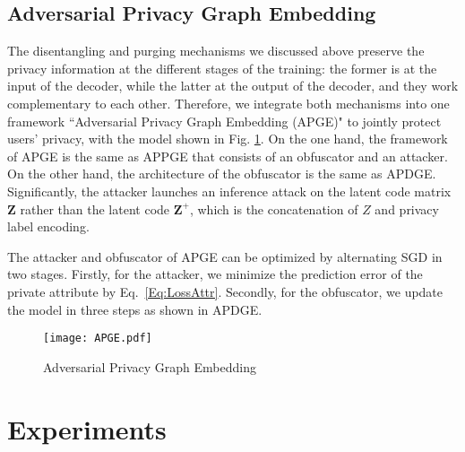 \documentclass{article}
\begin{document}
\subsection{Adversarial Privacy Graph Embedding}
The disentangling and purging mechanisms we discussed above preserve the privacy information at the different stages of the training: the former is at the input of the decoder, while the latter at the output of the decoder, and they work complementary to each other. Therefore, we integrate both mechanisms into one framework ``Adversarial Privacy Graph Embedding (APGE)" to jointly protect users' privacy, with the model shown in Fig. \ref{Fig:ASPGE}. On the one hand, the framework of APGE is the same as APPGE that consists of an obfuscator and an attacker. On the other hand, the architecture of the obfuscator is the same as APDGE. Significantly, the attacker launches an inference attack on the latent code matrix $\mathbf{Z}$ rather than the latent code $\mathbf{Z^+}$, which is the concatenation of $Z$ and privacy label encoding.

The attacker and obfuscator of APGE can be optimized by alternating SGD in two stages. Firstly, for the attacker, we minimize the prediction error of the private attribute by Eq.~\ref{Eq:LossAttr}. Secondly, for the obfuscator, we update the model in three steps as shown in APDGE.


\begin{figure}
  \centering
  \texttt{[image: APGE.pdf]}
  \caption{Adversarial Privacy Graph Embedding}
  \label{Fig:ASPGE}
\end{figure}



\section{Experiments}
\end{document}
